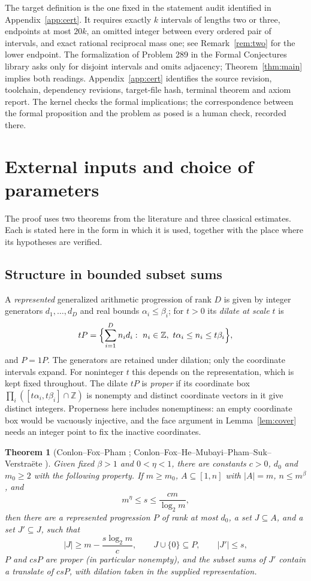 \documentclass[11pt,letterpaper]{article}
\numberwithin{equation}{section}
\theoremstyle{plain}
\newtheorem{theorem}{Theorem}
\theoremstyle{remark}
\newcommand{\Z}{\mathbb Z}
\begin{document}
The target definition is the one fixed in the statement audit identified in Appendix~\ref{app:cert}. It requires exactly $k$ intervals of lengths two or three, endpoints at most $20k$, an omitted integer between every ordered pair of intervals, and exact rational reciprocal mass one; see Remark~\ref{rem:two} for the lower endpoint. The formalization of Problem 289 in the Formal Conjectures library \cite{FC289} asks only for disjoint intervals and omits adjacency; Theorem~\ref{thm:main} implies both readings. Appendix~\ref{app:cert} identifies the source revision, toolchain, dependency revisions, target-file hash, terminal theorem and axiom report. The kernel checks the formal implications; the correspondence between the formal proposition and the problem as posed is a human check, recorded there.

\section{External inputs and choice of parameters}\label{sec:inputs}

The proof uses two theorems from the literature and three classical estimates. Each is stated here in the form in which it is used, together with the place where its hypotheses are verified.

\subsection{Structure in bounded subset sums}\label{sec:CF}

A \emph{represented} generalized arithmetic progression of rank $D$ is given by integer generators $d_1,\ldots,d_D$ and real bounds $\alpha_i\le\beta_i$; for $t>0$ its \emph{dilate at scale $t$} is
\[
tP=\Bigl\{\sum_{i=1}^Dn_id_i:\ n_i\in\Z,\ t\alpha_i\le n_i\le t\beta_i\Bigr\},
\]
and $P=1P$. The generators are retained under dilation; only the coordinate intervals expand. For noninteger $t$ this depends on the representation, which is kept fixed throughout. The dilate $tP$ is \emph{proper} if its coordinate box $\prod_i([t\alpha_i,t\beta_i]\cap\Z)$ is nonempty and distinct coordinate vectors in it give distinct integers. Properness here includes nonemptiness: an empty coordinate box would be vacuously injective, and the face argument in Lemma~\ref{lem:cover} needs an integer point to fix the inactive coordinates.

\begin{theorem}[Conlon--Fox--Pham {\cite[Theorem 1.5]{CFP}}; Conlon--Fox--He--Mubayi--Pham--Suk--Verstra\"ete {\cite[Theorem 3]{CFHMPSV}}]\label{thm:CF}
Given fixed $\beta>1$ and $0<\eta<1$, there are constants $c>0$, $d_0$ and $m_0\ge2$ with the following property. If $m\ge m_0$, $A\subseteq[1,n]$ with $|A|=m$, $n\le m^\beta$, and
\[
m^\eta\le s\le\frac{cm}{\log_2m},
\]
then there are a represented progression $P$ of rank at most $d_0$, a set $J\subseteq A$, and a set $J'\subseteq J$, such that
\[
|J|\ge m-\frac{s\log_2m}c,\qquad J\cup\{0\}\subseteq P,\qquad |J'|\le s,
\]
$P$ and $csP$ are proper (in particular nonempty), and the subset sums of $J'$ contain a translate of $csP$, with dilation taken in the supplied representation.
\end{theorem}
\end{document}
